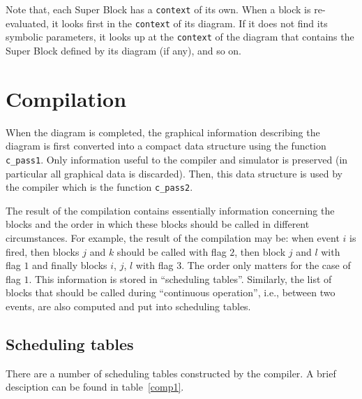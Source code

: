 \documentclass{book}
\begin{document}
Note that, each Super Block has a {\tt context} of its own. When a block is
re-evaluated, it looks first in the {\tt context} of its diagram. 
If it does not find its symbolic
parameters, it looks up at the {\tt context} of the diagram that contains
the Super Block defined by its diagram (if any), and so on.

\section{Compilation}
When the diagram is completed, the graphical information describing
the diagram is first converted into a compact data structure using the
function {\tt c\_pass1}. Only
information useful to the compiler and simulator is preserved (in
particular all graphical data is discarded). Then, this data structure
is used by the compiler which is the function {\tt c\_pass2}. 

\bigskip

The result of the compilation contains essentially
information concerning the blocks and the order
in which these blocks should be called in different
circumstances. For example, the result of the compilation may be: when
event $i$ is fired, then blocks $j$ 
and $k$ should be called with flag $2$, then block $j$ and $l$ with
flag $1$ and finally blocks $i$, $j$, $l$ with flag $3$. The order
only matters for the case of flag $1$. This information is stored in
``scheduling tables''. 
Similarly, the list of blocks that should be called during ``continuous
operation'', i.e., between two events, are also computed and put into
scheduling tables. 

\subsection{Scheduling tables}
There are a number of scheduling tables constructed by the compiler.
A brief desciption can be found in table~\ref{comp1}.
\end{document}
